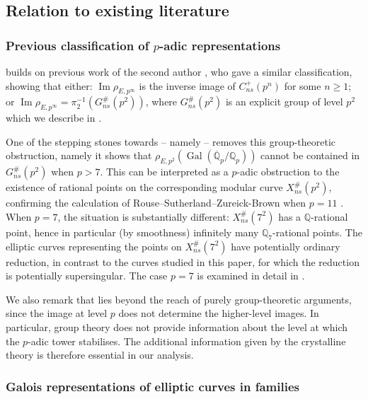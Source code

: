\documentclass{amsart}
\theoremstyle{definition}
\newcommand{\Q}{\mathbb{Q}}
\newcommand{\Gal}{\operatorname{Gal}}
\numberwithin{theorem}{section}
\numberwithin{equation}{section}
\begin{document}
\subsection{Relation to existing literature}

\subsubsection*{Previous classification of $p$-adic representations}
 builds on previous work of the second author \cite[Theorem 1.6]{furio24}, who gave a similar classification, showing that either: $\operatorname{Im}\rho_{E,p^\infty}$ is the inverse image of $C_{ns}^+(p^n)$ for some $n \geq 1$; or $\operatorname{Im}\rho_{E,p^\infty} = \pi_2^{-1}(G_{ns}^\#(p^2))$, where $G_{ns}^\#(p^2)$ is an explicit group of level $p^2$ which we describe in .

One of the stepping stones towards  -- namely  -- removes this group-theoretic obstruction, namely it shows that $\rho_{E,p^2}(\Gal(\overline{\Q}_p/\Q_p))$ cannot be contained in $G_{ns}^{\#}(p^2)$ when $p>7$. This can be interpreted as a $p$-adic obstruction to the existence of rational points on the corresponding modular curve $X^{\#}_{ns}(p^2)$, confirming the calculation of Rouse--Sutherland--Zureick-Brown when $p=11$ \cite[Section 8.7, label \texttt{121.605.41.1}]{rszb22}.
When $p=7$, the situation is substantially different: $X_{ns}^\#(7^2)$ has a $\Q$-rational point, hence in particular (by smoothness) infinitely many $\Q_7$-rational points. The elliptic curves representing the points on $X_{ns}^\#(7^2)$ have potentially ordinary reduction, in contrast to the curves studied in this paper, for which the reduction is potentially supersingular. The case $p=7$ is examined in detail in \cite{furio20257adicgaloisrepresentationselliptic}.

We also remark that  lies beyond the reach of purely group-theoretic arguments, since the image at level $p$ does not determine the higher-level images. In particular, group theory does not provide information about the level at which the $p$-adic tower stabilises. The additional information given by the crystalline theory is therefore essential in our analysis.

\subsubsection*{Galois representations of elliptic curves in families}
\end{document}
